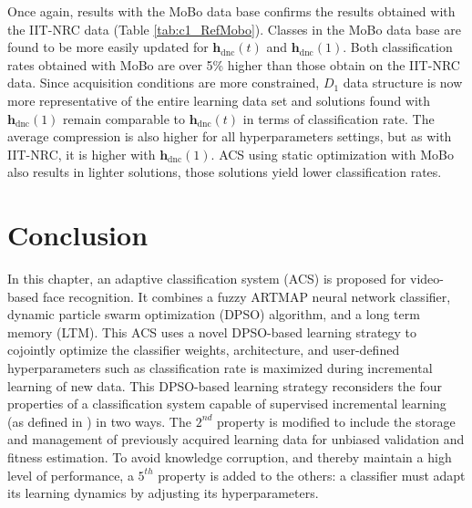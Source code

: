 Once again, results with the MoBo data base confirms the results obtained with the IIT-NRC data (Table \ref{tab:c1_RefMobo}). Classes in the MoBo data base are found to be more easily updated for $\textbf{h}_\text{dnc}(t)$ and $\textbf{h}_\text{dnc}(1)$. Both classification rates obtained with MoBo are over 5\% higher than those obtain on the IIT-NRC data. Since acquisition conditions are more constrained, $D_1$ data structure is now more representative of the entire learning data set and solutions found with $\textbf{h}_\text{dnc}(1)$ remain comparable to $\textbf{h}_\text{dnc}(t)$ in terms of classification rate. The average compression is also higher for all hyperparameters settings, but as with IIT-NRC, it is higher with $\textbf{h}_\text{dnc}(1)$. ACS using static optimization with MoBo also results in lighter solutions, those solutions yield lower classification rates.

\section{Conclusion}

In this chapter, an adaptive classification system (ACS) is proposed for video-based face recognition. It combines a fuzzy ARTMAP neural network classifier, dynamic particle swarm optimization (DPSO) algorithm, and a long term memory (LTM). This ACS uses a novel DPSO-based learning strategy to cojointly optimize the classifier weights, architecture, and user-defined hyperparameters such as classification rate is maximized during incremental learning of new data. This DPSO-based learning strategy reconsiders the four properties of a classification system capable of supervised incremental learning (as defined in \cite{polikar01}) in two ways. The $2^{nd}$ property is modified to include the storage and management of previously acquired learning data for unbiased validation and fitness estimation. To avoid knowledge corruption, and thereby maintain a high level of performance, a $5^{th}$ property is added to the others: a classifier must adapt its learning dynamics by adjusting its hyperparameters.

